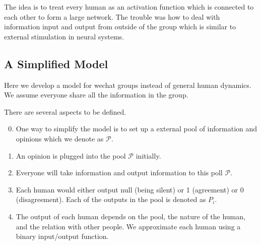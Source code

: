 \documentclass[letterpaper,10pt,english]{sphinxmanual}
\begin{document}
The idea is to treat every human as an activation function which is connected to each other to form a large network. The trouble was how to deal with information input and output from outside of the group which is similar to external stimulation in neural systems.


\subsection{A Simplified Model}
\label{\detokenize{topics/binary-human-model:a-simplified-model}}
Here we develop a model for wechat groups instead of general human dynamics. We assume everyone share all the information in the group.

There are several aspects to be defined.
\begin{enumerate}
\setcounter{enumi}{-1}
\item {} 
One way to simplify the model is to set up a external pool of information and opinions which we denote as \(\mathscr P\).

\item {} 
An opinion is plugged into the pool \(\mathscr P\) initially.

\item {} 
Everyone will take information and output information to this poll \(\mathscr P\).

\item {} 
Each human would either output null (being silent) or 1 (agreement) or 0 (disagreement). Each of the outputs in the pool is denoted as \(P_i\).

\item {} 
The output of each human depends on the pool, the nature of the human, and the relation with other people. We approximate each human using a binary input/output function.

\end{enumerate}
\end{document}
